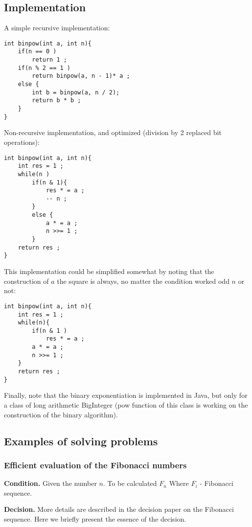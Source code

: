 \subsection{ Implementation }

A simple recursive implementation:

\begin{verbatim}
int binpow(int a, int n){
    if(n == 0 )
        return 1 ;
    if(n % 2 == 1 )
        return binpow(a, n - 1)* a ;
    else {
        int b = binpow(a, n / 2);
        return b * b ;
    }
} 
\end{verbatim}
Non-recursive implementation, and optimized (division by 2 replaced bit operations):

\begin{verbatim}
int binpow(int a, int n){
    int res = 1 ;
    while(n )
        if(n & 1){
            res * = a ;
            -- n ;
        }
        else {
            a * = a ;
            n >>= 1 ;
        }
    return res ;
} 
\end{verbatim}
This implementation could be simplified somewhat by noting that the construction of $a$ the square is always, no matter the condition worked odd $n$ or not:

\begin{verbatim}
int binpow(int a, int n){
    int res = 1 ;
    while(n){
        if(n & 1 )
            res * = a ;
        a * = a ;
        n >>= 1 ;
    }
    return res ;
} 
\end{verbatim}
Finally, note that the binary exponentiation is implemented in Java, but only for a class of long arithmetic BigInteger (pow function of this class is working on the construction of the binary algorithm).

\subsection{ Examples of solving problems }

\subsubsection{ Efficient evaluation of the Fibonacci numbers }

\textbf{Condition.} Given the number $n$. To be calculated $F_n$ Where $F_i$ - Fibonacci sequence.

\textbf{Decision.} More details are described in the decision paper on the Fibonacci sequence. Here we briefly present the essence of the decision.

